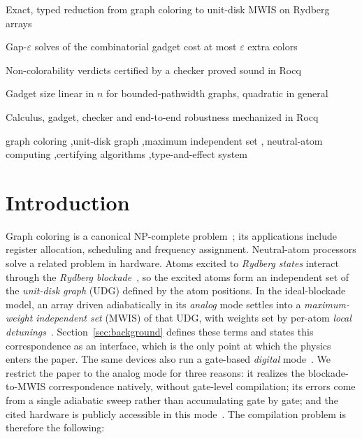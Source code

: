 \documentclass[a4paper,fleqn]{cas-sc}
\begin{document}
\begin{highlights}
\item Exact, typed reduction from graph coloring to unit-disk MWIS on Rydberg arrays
\item Gap-$\varepsilon$ solves of the combinatorial gadget cost at most $\varepsilon$ extra colors
\item Non-colorability verdicts certified by a checker proved sound in Rocq
\item Gadget size linear in $n$ for bounded-pathwidth graphs, quadratic in general
\item Calculus, gadget, checker and end-to-end robustness mechanized in Rocq
\end{highlights}

\begin{keywords}
graph coloring \sep unit-disk graph \sep maximum independent set \sep
neutral-atom computing \sep certifying algorithms \sep type-and-effect system
\end{keywords}

\maketitle
\section{Introduction}
\label{sec:intro}

Graph coloring is a canonical NP-complete problem~\cite{Karp1972,GareyJohnson1979};
its applications include register allocation, scheduling and frequency assignment.
Neutral-atom processors solve a related problem in hardware. Atoms excited to
\emph{Rydberg states} interact through the \emph{Rydberg
blockade}~\cite{Saffman2010,Henriet2020,Scholl2021}, so the excited atoms form an
independent set of the \emph{unit-disk graph} (UDG) defined by the atom positions. In
the ideal-blockade model, an array driven adiabatically in its \emph{analog} mode
settles into a \emph{maximum-weight independent set} (MWIS) of that UDG, with weights
set by per-atom \emph{local detunings}~\cite{Pichler2018,Ebadi2022,deOliveira2025}.
Section~\ref{sec:background} defines these terms and states this correspondence as an
interface, which is the only point at which the physics enters the paper. The same
devices also run a gate-based \emph{digital} mode~\cite{Graham2022}. We restrict the
paper to the analog mode for three reasons: it realizes the blockade-to-MWIS
correspondence natively, without gate-level compilation; its errors come from a single
adiabatic sweep rather than accumulating gate by gate; and the cited hardware is
publicly accessible in this mode~\cite{Wurtz2023}. The compilation problem is
therefore the following:
\end{document}
